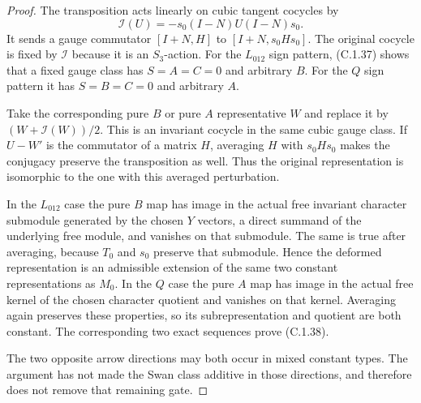 \begin{proof}
The transposition acts linearly on cubic tangent cocycles
by
\[
 \mathcal I(U)=-s_0(I-N)U(I-N)s_0.
\]
It sends a gauge commutator $[I+N,H]$ to
$[I+N,s_0Hs_0]$. The original cocycle is fixed by
$\mathcal I$ because it is an $S_3$-action.
For the $L_{012}$ sign pattern, (C.1.37) shows that a fixed
gauge class has $S=A=C=0$ and arbitrary $B$.
For the $Q$ sign pattern it has $S=B=C=0$ and arbitrary $A$.

Take the corresponding pure $B$ or pure $A$ representative
$W$ and replace it by $(W+\mathcal I(W))/2$.
This is an invariant cocycle in the same cubic gauge class.
If $U-W'$ is the commutator of a matrix $H$, averaging
$H$ with $s_0Hs_0$ makes the conjugacy preserve the
transposition as well. Thus the original representation is
isomorphic to the one with this averaged perturbation.

In the $L_{012}$ case the pure $B$ map has image in the
actual free invariant character submodule generated by the
chosen $Y$ vectors, a direct summand of the underlying free
module, and vanishes on that submodule.
The same is true after averaging, because $T_0$ and $s_0$
preserve that submodule. Hence the deformed representation
is an admissible extension of the same two constant
representations as $M_0$.
In the $Q$ case the pure $A$ map has image in the actual
free kernel of the chosen character quotient and vanishes
on that kernel. Averaging again preserves these properties,
so its subrepresentation and quotient are both constant.
The corresponding two exact sequences prove (C.1.38).

The two opposite arrow directions may both occur in mixed
constant types. The argument has not made the Swan class
additive in those directions, and therefore does not remove
that remaining gate.
\end{proof}
